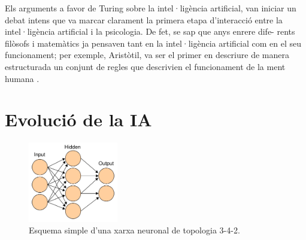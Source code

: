 Els arguments a favor de Turing sobre la intel·ligència artificial, van iniciar un debat intens que va marcar clarament la primera etapa d'interacció entre la intel·ligència artificial i la psicologia. De fet, se sap que anys enrere dife- rents filòsofs i matemàtics ja pensaven tant en la intel·ligència artificial com en el seu funcionament; per exemple, Aristòtil, va ser el primer en descriure de manera estructurada un conjunt de regles que descrivien el funcionament de la ment humana \cite{IAgen} \cite{IAgenII}.

\section{Evolució de la IA}

\begin{figure}[ht!]
\centering
\includegraphics[height=35mm]{data/nn.png}
\caption{Esquema simple d'una xarxa neuronal de topologia 3-4-2.}
\label{nn}
\end{figure} 


